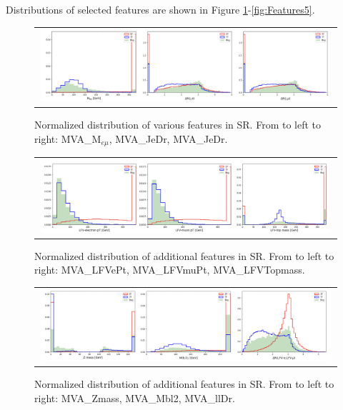 Distributions of selected features are shown in Figure \ref{fig:Features1}-\ref{fig:Features5}.

\begin{figure}[tbh!]
 \begin{center}
 \begin{tabular}{c}
  \includegraphics[width=0.99\textwidth]{figures/Part3/BDT/Features1}\\
 \end{tabular}
 \caption{Normalized distribution of various features in SR. From to left to right: MVA\_M$_{e\mu}$, MVA\_JeDr, MVA\_JeDr.}
 \label{fig:Features1}
 \end{center}
\end{figure}

\begin{figure}[tbh!]
 \begin{center}
 \begin{tabular}{c}
  \includegraphics[width=0.99\textwidth]{figures/Part3/BDT/Features2}\\
 \end{tabular}
 \caption{Normalized distribution of additional features in SR. From to left to right: MVA\_LFVePt, MVA\_LFVmuPt, MVA\_LFVTopmass.}
 \label{fig:Features2}
 \end{center}
\end{figure}

\begin{figure}[tbh!]
 \begin{center}
 \begin{tabular}{c}
  \includegraphics[width=0.99\textwidth]{figures/Part3/BDT/Features3}\\
 \end{tabular}
 \caption{Normalized distribution of additional features in SR. From to left to right: MVA\_Zmass, MVA\_Mbl2, MVA\_llDr.}
 \label{fig:Features3}
 \end{center}
\end{figure}

